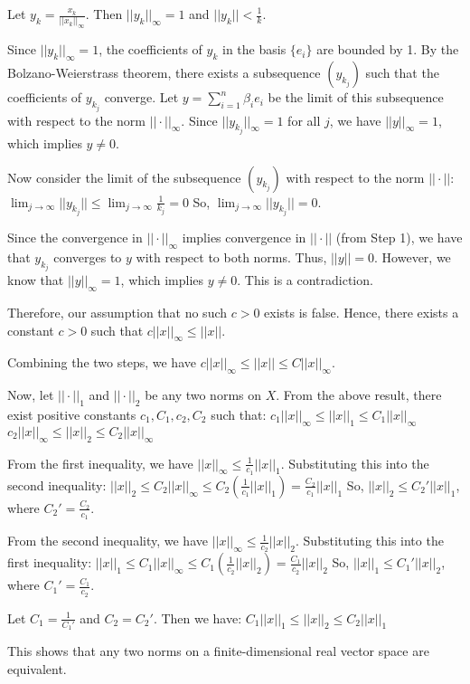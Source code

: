 Let $y_k = \frac{x_k}{||x_k||_\infty}$. Then $||y_k||_\infty = 1$ and $||y_k|| < \frac{1}{k}$.

Since $||y_k||_\infty = 1$, the coefficients of $y_k$ in the basis $\{e_i\}$ are bounded by 1. By the Bolzano-Weierstrass theorem, there exists a subsequence $(y_{k_j})$ such that the coefficients of $y_{k_j}$ converge. Let $y = \sum_{i=1}^n \beta_i e_i$ be the limit of this subsequence with respect to the norm $||\cdot||_\infty$. Since $||y_{k_j}||_\infty = 1$ for all $j$, we have $||y||_\infty = 1$, which implies $y \neq 0$.

Now consider the limit of the subsequence $(y_{k_j})$ with respect to the norm $||\cdot||$:
$\lim_{j \to \infty} ||y_{k_j}|| \le \lim_{j \to \infty} \frac{1}{k_j} = 0$
So, $\lim_{j \to \infty} ||y_{k_j}|| = 0$.

Since the convergence in $||\cdot||_\infty$ implies convergence in $||\cdot||$ (from Step 1), we have that $y_{k_j}$ converges to $y$ with respect to both norms. Thus, $||y|| = 0$. However, we know that $||y||_\infty = 1$, which implies $y \neq 0$. This is a contradiction.

Therefore, our assumption that no such $c > 0$ exists is false. Hence, there exists a constant $c > 0$ such that $c ||x||_\infty \le ||x||$.

Combining the two steps, we have $c ||x||_\infty \le ||x|| \le C ||x||_\infty$.

Now, let $||\cdot||_1$ and $||\cdot||_2$ be any two norms on $X$. From the above result, there exist positive constants $c_1, C_1, c_2, C_2$ such that:
$c_1 ||x||_\infty \le ||x||_1 \le C_1 ||x||_\infty$
$c_2 ||x||_\infty \le ||x||_2 \le C_2 ||x||_\infty$

From the first inequality, we have $||x||_\infty \le \frac{1}{c_1} ||x||_1$. Substituting this into the second inequality:
$||x||_2 \le C_2 ||x||_\infty \le C_2 \left(\frac{1}{c_1} ||x||_1\right) = \frac{C_2}{c_1} ||x||_1$
So, $||x||_2 \le C_2' ||x||_1$, where $C_2' = \frac{C_2}{c_1}$.

From the second inequality, we have $||x||_\infty \le \frac{1}{c_2} ||x||_2$. Substituting this into the first inequality:
$||x||_1 \le C_1 ||x||_\infty \le C_1 \left(\frac{1}{c_2} ||x||_2\right) = \frac{C_1}{c_2} ||x||_2$
So, $||x||_1 \le C_1' ||x||_2$, where $C_1' = \frac{C_1}{c_2}$.

Let $C_1 = \frac{1}{C_1'}$ and $C_2 = C_2'$. Then we have:
$C_1 ||x||_1 \le ||x||_2 \le C_2 ||x||_1$

This shows that any two norms on a finite-dimensional real vector space are equivalent.


